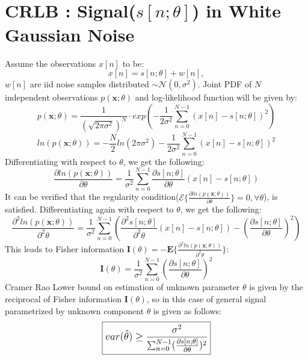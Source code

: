 \documentclass{article}
\begin{document}
\section{\\CRLB : Signal($s[n;\theta]$) in White Gaussian Noise}
Assume the observations $x[n]$ to be:
$$x[n] = s[n;\theta] + w[n],$$
$w[n]$ are iid noise samples distributed $\sim \mathcal{N}(0, \sigma^2)$. Joint PDF of $N$ independent observations $p(\mathbf x; \theta)$ and log-likelihood function will be given by:
$$p(\mathbf x; \theta) = \frac{1}{(\sqrt{2\pi \sigma^2})^N} \cdot exp(-\frac{1}{2\sigma^2}\sum^{N-1}_{n=0}(x[n] - s[n;\theta])^2)$$
$$ln(p(\mathbf x;\theta)) = -\frac{N}{2}ln(2\pi \sigma^2) - \frac{1}{2\sigma^2}\sum^{N-1}_{n=0}(x[n] - s[n;\theta])^2$$
Differentiating with respect to $\theta$, we get the following:
$$\frac{\partial ln(p(\mathbf x; \theta))}{\partial \theta} = \frac{1}{\sigma^2}\sum^{N-1}_{n=0}\frac{\partial s[n;\theta]}{\partial \theta}(x[n] - s[n;\theta])$$
It can be verified that the regularity condition($\mathcal{E}\{ \frac{\partial ln(p(\mathbf x; \theta))}{\partial \theta} \} = 0, \forall \theta$), is satisfied. Differentiating again with respect to $\theta$, we get the following:
$$\frac{\partial ^2 ln(p(\mathbf x; \theta))}{\partial ^2 \theta} = \frac{1}{\sigma^2}\sum^{N-1}_{n=0}(\frac{\partial ^2s[n;\theta]}{\partial ^2\theta}(x[n] - s[n;\theta]) - (\frac{\partial s[n;\theta]}{\partial \theta})^2)$$
This leads to Fisher information $\mathbf I (\theta) = -\mathbf E \{ \frac{\partial ^2ln(p(\mathbf x; \theta))}{\partial ^2\theta} \}$:
$$\mathbf I(\theta) = \frac{1}{\sigma^2}\sum^{N-1}_{n=0}(\frac{\partial s[n;\theta]}{\partial \theta} )^2 $$
Cramer Rao Lower bound on estimation of unknown parameter $\theta$ is given by the reciprocal of Fisher information $\mathbf{I}(\theta)$, so in this case of general signal parametrized by unknown component $\theta$ is given as follows:
\begin{equation} \label{eqA}
\large
\boxed {var(\hat{\theta}) \ge \frac{\sigma^2}{ \sum^{N-1}_{n=0} (\frac{\partial s[n;\theta]}{\partial \theta} )^2}}
\end{equation}

\newpage
\nocite{*}


\end{document}
